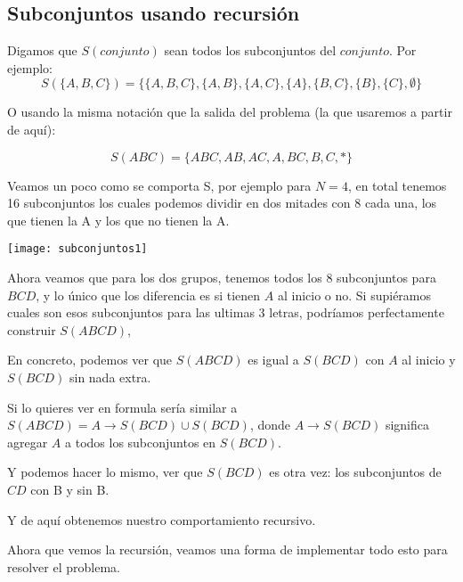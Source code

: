 \subsection* {Subconjuntos usando recursión}

Digamos que \(S(conjunto)\) sean todos los subconjuntos del \(conjunto\). Por ejemplo:
\[S(\{A,B,C\})=\{\{A,B,C\},\{A,B\},	\{A,C\},\{A\},\{B,C\},	\{B\},\{C\},	\emptyset\} \]

O usando la misma notación que la salida del problema (la que usaremos a partir de aquí):

\[S(ABC)=\{ABC, AB, AC, A, BC, B, C, * \}\]

Veamos un poco como se comporta S, por ejemplo para \(N = 4\), en total tenemos 16 subconjuntos los cuales podemos dividir en dos mitades con 8 cada una, los que tienen la A y los que no tienen la A.



\begin{center}
	\texttt{[image: subconjuntos1]}
\end{center}

Ahora veamos que para los dos grupos, tenemos todos los 8 subconjuntos para \(BCD\), y lo único que los diferencia es si tienen \(A\) al inicio o no. Si supiéramos cuales son esos subconjuntos para las ultimas 3 letras, podríamos perfectamente construir \(S(ABCD)\), 

En concreto, podemos ver que \(S(ABCD) \) es igual a \(S(BCD)\) con \(A\) al inicio y \(S(BCD)\) sin nada extra. 

Si lo quieres ver en formula sería similar a \(S(ABCD)=A\rightarrow S(BCD) \cup S(BCD)\), donde \(A\rightarrow S(BCD)\) significa agregar \(A\) a todos los subconjuntos en \(S(BCD)\).

Y podemos hacer lo mismo, ver que \(S(BCD)\) es otra vez: los subconjuntos de \(CD\) con B y sin B.

Y de aquí obtenemos nuestro comportamiento recursivo.

Ahora que vemos la recursión, veamos una forma de implementar todo esto para resolver el problema.

